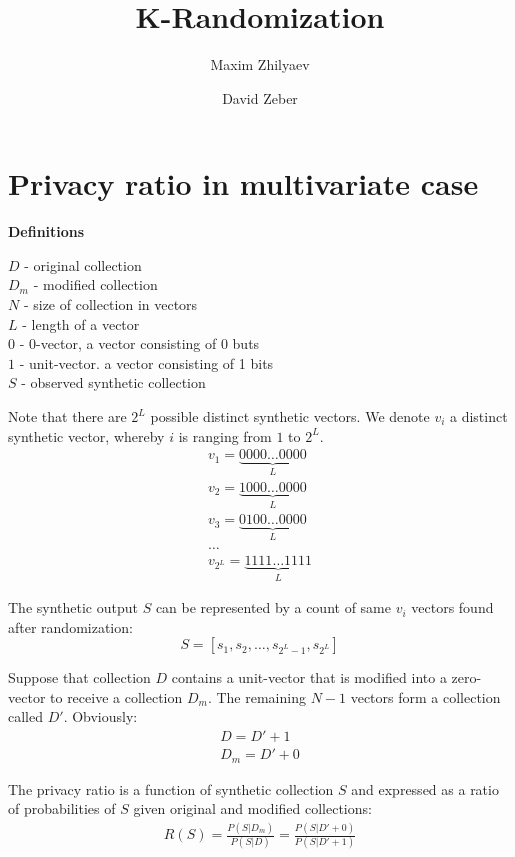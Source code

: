 \documentclass[11pt,draft]{article}
\title{K-Randomization}
\author{Maxim Zhilyaev \and David Zeber}
\begin{document}
\maketitle


\section{Privacy ratio in multivariate case}

\textbf{Definitions}

  $D$ - original collection \\
  $D_m$ - modified collection \\

  $N$ - size of collection in vectors \\
  $L$ - length of a vector \\
  $0$ - 0-vector, a vector consisting of  0 buts \\
  $1$ - unit-vector. a vector consisting of 1 bits \\
  $S$ - observed synthetic collection
  
Note that there are  $2^L$ possible distinct synthetic vectors. We denote $v_i$ a distinct synthetic vector, whereby $i$ is ranging from $1$ to $2^L$.
\begin{align}
v_1 = \underset{L}{\underbrace{0000 \dots 0000}} \\
v_2 = \underset{L}{\underbrace{1000 \dots 0000}} \\
v_3 = \underset{L}{\underbrace{0100 \dots 0000}} \\
\dots \\
v_{2^L} =  \underset{L}{\underbrace{1111 \dots 1111}} 
\end{align}



The synthetic output $S$ can be represented by a count of same $v_i$ vectors found after randomization:
\[ S = [s_1,s_2,\dots,s_{2^L-1},s_{2^L}] \]

Suppose that collection $D$ contains a unit-vector that is modified into a zero-vector to receive a collection $D_m$.  The remaining $N-1$ vectors form a collection called $D'$.
Obviously:
\begin{align}
D =  D' + 1 \\
D_m = D' + 0
\end{align}

The privacy ratio is a function of synthetic collection $S$ and expressed as a ratio of probabilities of $S$ given original and modified collections:
\begin{align}
R(S) = \frac{P(S|D_m)}{P(S|D)} =  \frac{P(S|D'+0)}{P(S|D'+1)}
\end{align}
\end{document}
